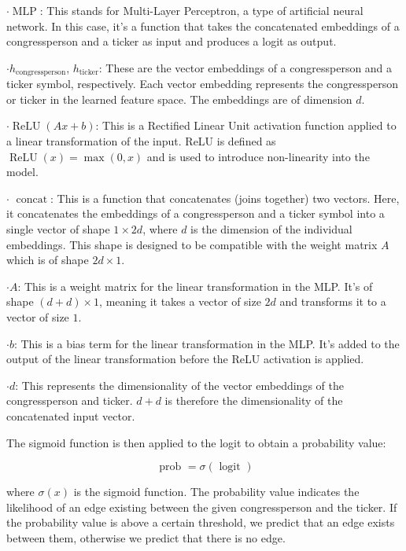 \documentclass[15pt,letterpaper]{article}
\begin{document}
  $\boldsymbol{\cdot} \operatorname{MLP}$: This stands for Multi-Layer Perceptron, a type of artificial neural network. In this case, it's a function that takes the concatenated embeddings of a congressperson and a ticker as input and produces a logit as output.
  
  $\boldsymbol{\cdot} h_{\text{congressperson}}$, $h_{\text{ticker}}$: These are the vector embeddings of a congressperson and a ticker symbol, respectively. Each vector embedding represents the congressperson or ticker in the learned feature space. The embeddings are of dimension $d$.
  
  $\boldsymbol{\cdot} \operatorname{ReLU}(Ax + b)$: This is a Rectified Linear Unit activation function applied to a linear transformation of the input. ReLU is defined as $\operatorname{ReLU}(x) = \max(0, x)$ and is used to introduce non-linearity into the model.
  
  $\boldsymbol{\cdot}$  $\operatorname{concat}$: This is a function that concatenates (joins together) two vectors. Here, it concatenates the embeddings of a congressperson and a ticker symbol into a single vector of shape $1 \times 2d$, where $d$ is the dimension of the individual embeddings. This shape is designed to be compatible with the weight matrix $A$ which is of shape $2d \times 1$.
  
  $\boldsymbol{\cdot} A$: This is a weight matrix for the linear transformation in the MLP. It's of shape $(d+d) \times 1$, meaning it takes a vector of size $2d$ and transforms it to a vector of size $1$.
  
  $\boldsymbol{\cdot} b$: This is a bias term for the linear transformation in the MLP. It's added to the output of the linear transformation before the ReLU activation is applied.
  
  $\boldsymbol{\cdot} d$: This represents the dimensionality of the vector embeddings of the congressperson and ticker. $d+d$ is therefore the dimensionality of the concatenated input vector.
    
The sigmoid function is then applied to the logit to obtain a probability value:

$$
\text { prob }=\sigma(\text { logit })
$$

where $\sigma(x)$ is the sigmoid function. The probability value indicates the likelihood of an edge existing between the given congressperson and the ticker. If the probability value is above a certain threshold, we predict that an edge exists between them, otherwise we predict that there is no edge.
\end{document}
